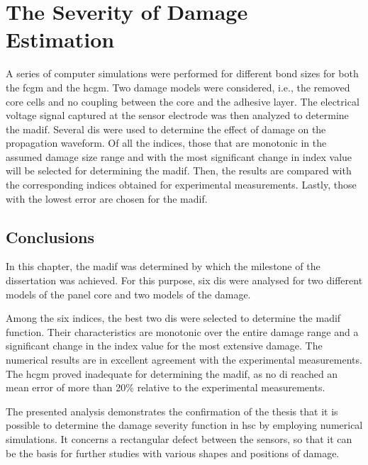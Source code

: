\chapter[The Severity of Damage Estimation]{The Severity of Damage Estimation}
\label{ch:severity}

A series of computer simulations were performed for different bond sizes for both the \ac{fcgm} and the \ac{hcgm}.
Two damage models were considered, i.e., the removed core cells  and no coupling between the core and the adhesive layer.
The electrical voltage signal captured at the sensor electrode was then analyzed to determine the \ac{madif}.
Several \acfp{di} were used to determine the effect of damage on the propagation waveform.
Of all the indices, those that are monotonic in the assumed damage size range and with the most significant change in index value will be selected for determining the \ac{madif}.
Then, the results are compared with the corresponding indices obtained for experimental measurements.
Lastly, those with the lowest error are chosen for the \ac{madif}.




\section{Conclusions}
\label{sec:conclusionsSever}
In this chapter, the \ac{madif} was determined by which the milestone of the dissertation was achieved.
For this purpose, six \acp{di} were analysed for two different models of the panel core and two models of the damage.

Among the six indices, the best two \acp{di} were selected to determine the \ac{madif} function.
Their characteristics are monotonic over the entire damage range and a significant change in the index value for the most extensive damage.
The numerical results are in excellent agreement with the experimental measurements.
The \ac{hcgm} proved inadequate for determining the \ac{madif}, as no \ac{di} reached an mean error of more than 20\% relative to the experimental measurements.

The presented analysis demonstrates the confirmation of the thesis that it is possible to determine the damage severity function in \ac{hsc} by employing numerical simulations.
It concerns a rectangular defect between the sensors, so that it can be the basis for further studies with various shapes and positions of damage.